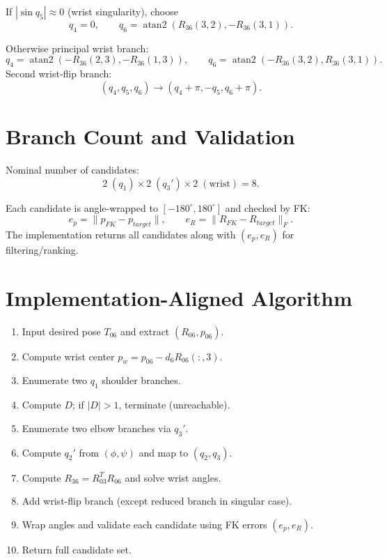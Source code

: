 \documentclass[11pt]{article}
\begin{document}
If $|\sin q_5|\approx0$ (wrist singularity), choose
\begin{equation}
    q_4=0,
    \qquad
    q_6=\operatorname{atan2}(R_{36}(3,2),-R_{36}(3,1)).
\end{equation}

Otherwise principal wrist branch:
\begin{equation}
    q_4=\operatorname{atan2}(-R_{36}(2,3),-R_{36}(1,3)),
    \qquad
    q_6=\operatorname{atan2}(-R_{36}(3,2),R_{36}(3,1)).
\end{equation}
Second wrist-flip branch:
\begin{equation}
    (q_4,q_5,q_6)\rightarrow(q_4+\pi,-q_5,q_6+\pi).
\end{equation}

\section{Branch Count and Validation}
Nominal number of candidates:
\begin{equation}
    2\;(q_1)\times2\;(q_3')\times2\;(\text{wrist})=8.
\end{equation}

Each candidate is angle-wrapped to $[-180^\circ,180^\circ]$ and checked by FK:
\begin{equation}
    e_p=\|p_{FK}-p_{target}\|,
    \qquad
    e_R=\|R_{FK}-R_{target}\|_F.
\end{equation}
The implementation returns all candidates along with $(e_p,e_R)$ for filtering/ranking.

\section{Implementation-Aligned Algorithm}
\begin{enumerate}[leftmargin=1.5em]
    \item Input desired pose $T_{06}$ and extract $(R_{06},p_{06})$.
    \item Compute wrist center $p_w=p_{06}-d_6R_{06}(:,3)$.
    \item Enumerate two $q_1$ shoulder branches.
    \item Compute $D$; if $|D|>1$, terminate (unreachable).
    \item Enumerate two elbow branches via $q_3'$.
    \item Compute $q_2'$ from $(\phi,\psi)$ and map to $(q_2,q_3)$.
    \item Compute $R_{36}=R_{03}^TR_{06}$ and solve wrist angles.
    \item Add wrist-flip branch (except reduced branch in singular case).
    \item Wrap angles and validate each candidate using FK errors $(e_p,e_R)$.
    \item Return full candidate set.
\end{enumerate}
\end{document}
